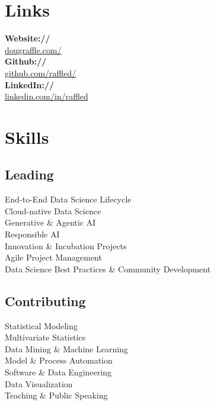 \documentclass[letterpaper]{deedy-resume} %
\begin{document}
\begin{minipage}[t]{0.3\textwidth}

  \section{Links} 
  {\bf Website://}\\ \href{http://www.dougraffle.com/}{dougraffle.com/}\\
  {\bf Github://}\\ \href{http://github.com/raffled/}{github.com/raffled/}\\
  {\bf LinkedIn://}\\ \href{https://www.linkedin.com/in/raffled}{linkedin.com/in/raffled} \\
  
  \vspace{30pt}
  
  \section{Skills}
  \subsection{Leading}
  End-to-End Data Science Lifecycle\\
  Cloud-native Data Science\\
  Generative \& Agentic AI\\
  Responsible AI\\
  Innovation \& Incubation Projects\\
  Agile Project Management\\
  Data Science Best Practices \& Community Development\\
  
  \vspace{10pt}
  
  \subsection{Contributing}
  Statistical Modeling\\
  Multivariate Statistics\\
  Data Mining \& Machine Learning\\
  Model \& Process Automation\\
  Software \& Data Engineering\\
  Data Visualization\\
  Teaching \& Public Speaking\\


\end{minipage}
\end{document}
